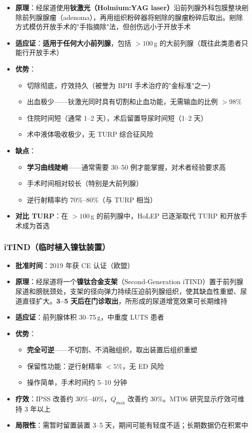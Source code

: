 \begin{itemize}[leftmargin=2cm]
	\item \textbf{原理}：经尿道使用\textbf{钬激光（Holmium:YAG laser）}沿前列腺外科包膜整块剜除前列腺腺瘤（adenoma），再用组织粉碎器将剜除的腺瘤粉碎后取出。剜除方式模仿开放手术的"手指摘除"法，但创伤远小于开放手术
	\item \textbf{适应证}：\textbf{适用于任何大小前列腺}，包括 $>100$\,g 的大前列腺（既往此类患者只能行开放手术）
	\item \textbf{优势}：
	\begin{itemize}
		\item 切除彻底，疗效持久（被誉为 BPH 手术治疗的"金标准"之一）
		\item 出血极少——钬激光同时具有切割和止血功能，无需输血的比例 $>98\%$
		\item 住院时间短（通常 1--2 天），术后留置导尿时间短（1--2 天）
		\item 术中液体吸收极少，无 TURP 综合征风险
	\end{itemize}
	\item \textbf{缺点}：
	\begin{itemize}
		\item \textbf{学习曲线陡峭}——通常需要 30--50 例才能掌握，对术者经验要求高
		\item 手术时间相对较长（特别是大前列腺）
		\item 逆行射精率约 70\%--80\%（与 TURP 相当）
	\end{itemize}
	\item \textbf{对比 TURP}：在 $>100$\,g 的前列腺中，HoLEP 已逐渐取代 TURP 和开放手术成为首选
\end{itemize}

\subsubsection{iTIND（临时植入镍钛装置）}

\begin{itemize}[leftmargin=2cm]
	\item \textbf{批准时间}：2019 年获 CE 认证（欧盟）
	\item \textbf{原理}：经尿道将一个\textbf{镍钛合金支架}（Second-Generation iTIND）置于前列腺尿道和膀胱颈处，支架的径向弹力持续压迫前列腺组织，使其缺血性重塑、尿道直径扩大。\textbf{3--5 天后在门诊取出}，所形成的尿道增宽效果可长期维持
	\item \textbf{适应证}：前列腺体积 30--75\,g，中重度 LUTS 患者
	\item \textbf{优势}：
	\begin{itemize}
		\item \textbf{完全可逆}——不切割、不消融组织，取出装置后组织重塑
		\item 保留性功能：逆行射精率 $<5\%$，无 ED 风险
		\item 操作简单，手术时间约 5--10 分钟
	\end{itemize}
	\item \textbf{疗效}：IPSS 改善约 30\%--40\%，$Q_{\max}$ 改善约 30\%。MT06 研究显示疗效可维持 3 年以上
	\item \textbf{局限性}：需暂时留置装置 3--5 天，期间可能有轻度不适；长期数据仍在积累中
\end{itemize}


